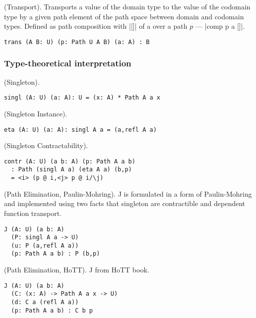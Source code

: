 \documentclass{article}
\begin{document}
\begin{theorem} (Transport).
Transports a value of the domain type to the value of the codomain type
by a given path element of the path space between domain and codomain types.
Defined as path composition with |[]| of a over a path $p$ --- |comp p a []|.
\begin{lstlisting}
trans (A B: U) (p: Path U A B) (a: A) : B
\end{lstlisting}
\end{theorem}

\subsubsection*{Type-theoretical interpretation}
\begin{definition} (Singleton).
\begin{lstlisting}
singl (A: U) (a: A): U = (x: A) * Path A a x
\end{lstlisting}
\end{definition}

\begin{theorem} (Singleton Instance).
\begin{lstlisting}
eta (A: U) (a: A): singl A a = (a,refl A a)
\end{lstlisting}
\end{theorem}

\begin{theorem} (Singleton Contractability).
\begin{lstlisting}
contr (A: U) (a b: A) (p: Path A a b)
  : Path (singl A a) (eta A a) (b,p)
  = <i> (p @ i,<j> p @ i/\j)
\end{lstlisting}
\end{theorem}

\begin{theorem} (Path Elimination, Paulin-Mohring).
J is formulated in a form of Paulin-Mohring and implemented using
two facts that singleton are contractible and dependent function
transport.
\begin{lstlisting}
J (A: U) (a b: A)
  (P: singl A a -> U)
  (u: P (a,refl A a))
  (p: Path A a b) : P (b,p)
\end{lstlisting}
\end{theorem}

\begin{theorem} (Path Elimination, HoTT).
J from HoTT book.
\begin{lstlisting}
J (A: U) (a b: A)
  (C: (x: A) -> Path A a x -> U)
  (d: C a (refl A a))
  (p: Path A a b) : C b p
\end{lstlisting}
\end{theorem}
\end{document}
